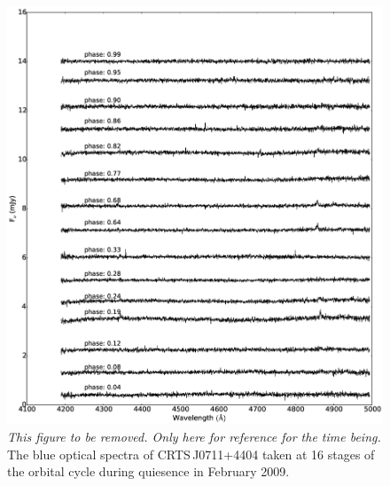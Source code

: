 \documentclass[a4paper,fleqn,usenatbib]{mnras}
\begin{document}
\begin{figure}
\centering
\includegraphics[width=\textwidth]{images/blue_spectra.eps}
\caption[Caption for spectra]{ \emph{This figure to be removed. Only here for reference for the time being.} The blue optical spectra of CRTS\,J0711+4404 taken at 16 stages of the orbital cycle during quiesence in February 2009.  }
\label{fig:spectra-quiescent-blue}
\end{figure}
\end{document}
